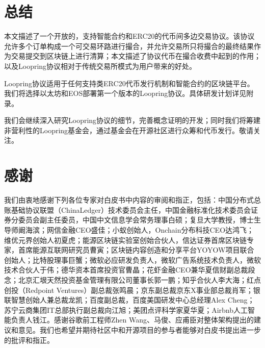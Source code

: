 \documentclass[UTF8,nofonts]{ctexart}
\begin{document}

\section{总结\label{sec:summary}}

本文描述了一个开放的，支持智能合约和ERC20的代币间多边交易协议。该协议允许多个订单构成一个可交易环路进行撮合，并允许交易所只将撮合的最终结果作为交易提交到区块链上进行清算；本文描述了协议代币在撮合收费中起到的作用；以及Loopring协议相对于传统交易所模式为用户带来的好处。

Loopring协议适用于任何支持类ERC20代币发行机制和智能合约的区块链平台。我们将选择以太坊和EOS部署第一个版本的Loopring协议。具体研发计划详见附录。

我们会继续深入研究Loopring协议的细节，完善概念证明的开发；同时我们将筹建非营利性的Loopring基金会，通过基金会在开源社区进行众筹和代币发行。敬请关注。

\section{感谢\label{sec:acknowledgement}}

我们由衷地感谢下列各位专家对白皮书中内容的审阅和指正，包括：中国分布式总账基础协议联盟（ChinaLedger）技术委员会主任，中国金融标准化技术委员会证券分委员会副主任委员，中国中文信息学会常务理事白硕；复旦大学教授，博士生导师阚海滨；网信金融CEO盛佳；小蚁创始人，Onchain分布科技CEO达鸿飞；维优元界创始人初夏虎；能源区块链实验室创始合伙人，信达证券首席区块链专家，首席能源互联网研究员曹寅；区块链内容创造和分享平台YOYOW项目​联合创始人；比特股理事巨蟹；微软必应研发负责人，微软广告系统技术负责人，微软技术合伙人于伟；德华资本首席投资官​曹晶；花虾金融CEO兼华夏信财副总裁段念；北京汇垠天然投资基金管理有限公司董事长郭一鹏；知乎合伙人李大海；红点创投（Redpoint Ventures）副总裁张鸣晨；京东副总裁京东X事业部总裁肖军；银联智慧创始人兼总裁龙凯；百度副总裁，百度美国研发中心总经理Alex Cheng；苏宁云商集团IT总部执行副总裁向江旭；美团点评科学家夏华夏；Airbnb人工智能负责人钱江。感谢谷歌前工程师Zhen Wang、马俊、应甫臣对整体架构提出的建议和意见。我们也希望并期待社区中和开源项目的参与者能够对白皮书提出进一步的批评和指正。

\newpage



\newpage
\end{document}
